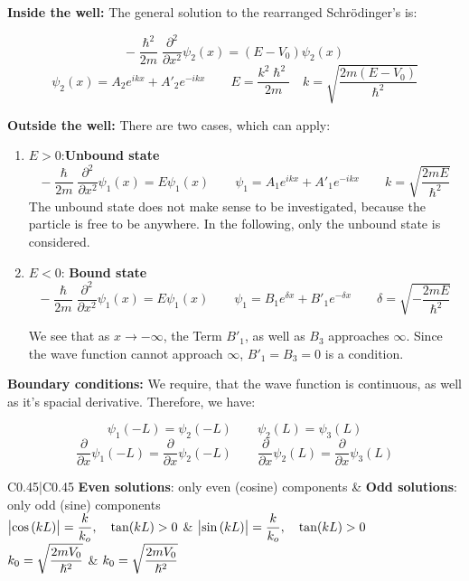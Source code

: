 \documentclass[a4paper, 9pt]{extarticle}
\begin{document}
\begin{twocolumn}
\textbf{Inside the well: }The general solution to the rearranged Schrödinger's is:

$$-\frac{\hslash^2}{2m} \frac{\partial^2}{\partial x^2}\psi_2(x) = (E-V_0) \psi_2(x)$$
$$\psi_2(x) = A_2 e^{i k x} + A'_2 e^{-i k x} \qquad E = \frac{k^2 \hslash^2}{2m} \quad k = \sqrt{\frac{2 m (E-V_0)}{\hslash^2}}$$

\textbf{Outside the well: }There are two cases, which can apply:

\begin{enumerate}
	\item $E > 0$:\textbf{Unbound state}
	$$-\frac{\hslash}{2m} \frac{\partial^2}{\partial x^2}\psi_{1}(x) = E \psi_{1}(x) \qquad \psi_1 =  A_1 e^{i k x} + A'_1 e^{-i k x} \qquad k = \sqrt{\frac{2 m E}{\hslash^2}}$$
	The unbound state does not make sense to be investigated, because the particle is free to be anywhere. In the following, only the unbound state is considered.
	\item $E < 0$: \textbf{Bound state}
	$$-\frac{\hslash}{2m} \frac{\partial^2}{\partial x^2}\psi_{1}(x) = E \psi_{1}(x) \qquad \psi_1 = B_1 e^{\delta x} + B'_1 e^{-\delta x} \qquad \delta = \sqrt{-\frac{2 m E}{\hslash^2}}$$
	
	We see that as $x \rightarrow -\infty$, the Term $B'_1$, as well as $B_3$ approaches $\infty$. Since the wave function cannot approach $\infty$, $B'_1 = B_3 = 0$ is a condition.
	  
\end{enumerate}

\begin{donotbrake}
	
\textbf{Boundary conditions:} We require, that the wave function is continuous, as well as it's spacial derivative. Therefore, we have:

$$\psi_1 (-L) =\psi_2(-L) \qquad \psi_2 (L) = \psi_3(L)$$
$$\frac{\partial}{\partial x}\psi_1 (-L) = \frac{\partial}{\partial x}\psi_2(-L) \qquad \frac{\partial}{\partial x}\psi_2 (L) =\frac{\partial}{\partial x}\psi_3(L)$$

\end{donotbrake}

\begin{mtabular}{C{0.45\columnwidth}|C{0.45\columnwidth}}
	\textbf{Even solutions}: only even (cosine) components &
	\textbf{Odd solutions}: only odd (sine) components \\
	$\displaystyle \left| \cos \left(k L\right) \right| =\frac{k}{k_o}, \quad \tan (k L) > 0$ &
	$\displaystyle \left| \sin \left(k L\right) \right| =\frac{k}{k_o}, \quad \tan (k L) > 0$ \\
	$\displaystyle k_0 = \sqrt{\frac{2 m V_0}{\hslash^2}}$ & 
	$\displaystyle k_0 = \sqrt{\frac{2 m V_0}{\hslash^2}}$ \\
	

\end{mtabular}
\end{twocolumn}
\end{document}
